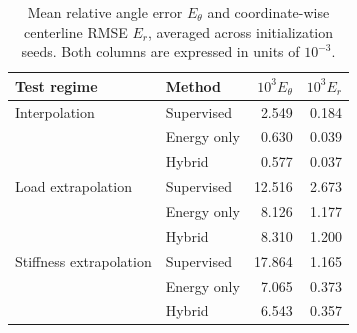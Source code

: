 \begin{table}[htbp]
\centering\small
\caption{Mean relative angle error $E_\theta$ and coordinate-wise centerline RMSE $E_r$, averaged across initialization seeds. Both columns are expressed in units of $10^{-3}$.}\label{tab:secondary}
\begin{tabular}{llrr}\toprule
Test regime & Method & $10^3 E_\theta$ & $10^3 E_r$\\\midrule
Interpolation & Supervised & 2.549 & 0.184\\
 & Energy only & 0.630 & 0.039\\
 & Hybrid & 0.577 & 0.037\\
\midrule
Load extrapolation & Supervised & 12.516 & 2.673\\
 & Energy only & 8.126 & 1.177\\
 & Hybrid & 8.310 & 1.200\\
\midrule
Stiffness extrapolation & Supervised & 17.864 & 1.165\\
 & Energy only & 7.065 & 0.373\\
 & Hybrid & 6.543 & 0.357\\
\bottomrule\end{tabular}
\end{table}
